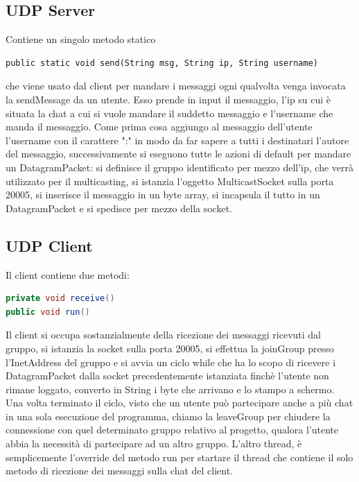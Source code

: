 \documentclass[]{article}
\begin{document}
\subsection{UDP Server}
Contiene un singolo metodo statico
\begin{lstlisting}
public static void send(String msg, String ip, String username)
\end{lstlisting}
che viene usato dal client per mandare i messaggi ogni qualvolta venga invocata la sendMessage da un utente.
Esso prende in input il messaggio, l'ip su cui è situata la chat a cui si vuole mandare il suddetto messaggio e l'username che manda il messaggio.
Come prima cosa aggiungo al messaggio dell'utente l'username con il carattere ":" in modo da far sapere a tutti i destinatari l'autore del messaggio, successivamente si eseguono tutte le azioni di default per mandare un DatagramPacket: si definisce il gruppo identificato per mezzo dell'ip, che verrà utilizzato per il multicasting, si istanzia l'oggetto MulticastSocket sulla porta 20005, si inserisce il messaggio in un byte array, si incapsula il tutto in un DatagramPacket e si spedisce per mezzo della socket.
\subsection{UDP Client}
Il client contiene due metodi:
\begin{lstlisting}[language=java]
private void receive()
public void run()
\end{lstlisting}
Il client si occupa sostanzialmente della ricezione dei messaggi ricevuti dal gruppo, si istanzia la socket sulla porta 20005, si effettua la joinGroup presso l'InetAddress del gruppo e si avvia un ciclo while che ha lo scopo di ricevere i DatagramPacket dalla socket precedentemente istanziata finchè l'utente non rimane loggato, converto in String i byte che arrivano e lo stampo a schermo.
Una volta terminato il ciclo, visto che un utente può partecipare anche a più chat in una sola esecuzione del programma, chiamo la leaveGroup per chiudere la connessione con quel determinato gruppo relativo al progetto, qualora l'utente abbia la necessità di partecipare ad un altro gruppo.
L'altro thread, è semplicemente l'override del metodo run per startare il thread che contiene il solo metodo di ricezione dei messaggi sulla chat del client.
\end{document}
